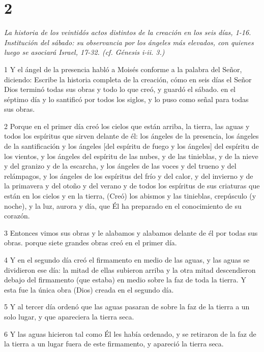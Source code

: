 \chapter{2}

\par \textit{La historia de los veintidós actos distintos de la creación en los seis días, 1-16. Institución del sábado: su observancia por los ángeles más elevados, con quienes luego se asociará Israel, 17-32. (cf. Génesis i-ii. 3.)}

\par 1 Y el ángel de la presencia habló a Moisés conforme a la palabra del Señor, diciendo: Escribe la historia completa de la creación, cómo en seis días el Señor Dios terminó todas sus obras y todo lo que creó, y guardó el sábado. en el séptimo día y lo santificó por todos los siglos, y lo puso como señal para todas sus obras.
\par 2 Porque en el primer día creó los cielos que están arriba, la tierra, las aguas y todos los espíritus que sirven delante de él: los ángeles de la presencia, los ángeles de la santificación y los ángeles [del espíritu de fuego y los ángeles] del espíritu de los vientos, y los ángeles del espíritu de las nubes, y de las tinieblas, y de la nieve y del granizo y de la escarcha, y los ángeles de las voces y del trueno y del relámpagos, y los ángeles de los espíritus del frío y del calor, y del invierno y de la primavera y del otoño y del verano y de todos los espíritus de sus criaturas que están en los cielos y en la tierra, (Creó) los abismos y las tinieblas, crepúsculo (y noche), y la luz, aurora y día, que Él ha preparado en el conocimiento de su corazón.
\par 3 Entonces vimos sus obras y le alabamos y alabamos delante de él por todas sus obras. porque siete grandes obras creó en el primer día.
\par 4 Y en el segundo día creó el firmamento en medio de las aguas, y las aguas se dividieron ese día: la mitad de ellas subieron arriba y la otra mitad descendieron debajo del firmamento (que estaba) en medio sobre la faz de toda la tierra. Y esta fue la única obra (Dios) creada en el segundo día.
\par 5 Y al tercer día ordenó que las aguas pasaran de sobre la faz de la tierra a un solo lugar, y que apareciera la tierra seca.
\par 6 Y las aguas hicieron tal como Él les había ordenado, y se retiraron de la faz de la tierra a un lugar fuera de este firmamento, y apareció la tierra seca.
